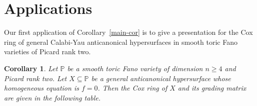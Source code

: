 \documentclass{amsart}
\newtheorem{corollary}[theorem]{Corollary}
\theoremstyle{definition}
\theoremstyle{remark}
\begin{document}
\section{Applications}
\label{sec:applications}

Our first application of Corollary~\ref{main-cor}
is to give a presentation for the
Cox ring of general Calabi-Yau anticanonical
hypersurfaces in smooth
toric Fano varieties of Picard rank two.

\begin{corollary}
\label{mt}
Let $\mathbb P$ be a smooth toric Fano variety
of dimension $n\geq 4$ and Picard rank two.
Let $X\subseteq\mathbb P$ be a general anticanonical
hypersurface whose homogeneous equation
is $f = 0$.
Then the Cox ring of $X$
and its grading matrix are given in the
following table.


\end{corollary}
\end{document}
